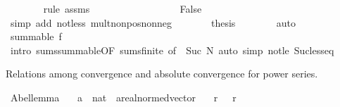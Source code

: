\begin{isabellebody}
\ \ \ \ \ \ \isamarkupfalse%
\ {\isacharparenleft}{\kern0pt}rule\ assms{\isacharparenleft}{\kern0pt}{}{\isacharparenright}{\kern0pt}{\isacharparenright}{\kern0pt}\isanewline
\ \ \ \ \isamarkupfalse%
\ \isamarkupfalse%
\ {\isachardoublequoteopen}{\isasymdots}\ {\isasymle}\ {}{\isachardoublequoteclose}\isanewline
\ \ \ \ \ \ \isamarkupfalse%
\ False\ \isamarkupfalse%
\ {\isacharparenleft}{\kern0pt}simp\ add{\isacharcolon}{\kern0pt}\ not{\isacharunderscore}{\kern0pt}less\ mult{\isacharunderscore}{\kern0pt}nonpos{\isacharunderscore}{\kern0pt}nonneg{\isacharparenright}{\kern0pt}\isanewline
\ \ \ \ \isamarkupfalse%
\ \isamarkupfalse%
\ {\isacharquery}{\kern0pt}thesis\isanewline
\ \ \ \ \ \ \isamarkupfalse%
\ auto\isanewline
\ \ \isamarkupfalse%
\isanewline
\ \ \isamarkupfalse%
\ \isamarkupfalse%
\ {\isachardoublequoteopen}summable\ f{\isachardoublequoteclose}\isanewline
\ \ \ \ \isamarkupfalse%
\ {\isacharparenleft}{\kern0pt}intro\ sums{\isacharunderscore}{\kern0pt}summable{\isacharbrackleft}{\kern0pt}OF\ sums{\isacharunderscore}{\kern0pt}finite{\isacharcomma}{\kern0pt}\ of\ {\isachardoublequoteopen}{\isacharbraceleft}{\kern0pt}{\isachardot}{\kern0pt}{\isachardot}{\kern0pt}\ Suc\ N{\isacharbraceright}{\kern0pt}{\isachardoublequoteclose}{\isacharbrackright}{\kern0pt}{\isacharparenright}{\kern0pt}\ {\isacharparenleft}{\kern0pt}auto\ simp{\isacharcolon}{\kern0pt}\ not{\isacharunderscore}{\kern0pt}le\ Suc{\isacharunderscore}{\kern0pt}less{\isacharunderscore}{\kern0pt}eq{}{\isacharparenright}{\kern0pt}\isanewline
{}\isamarkupfalse%
%
\endisatagproof
{\isafoldproof}%
%
\isadelimproof
\isanewline
%
\endisadelimproof
\isanewline
{}\isamarkupfalse%
%
\begin{isamarkuptext}%
Relations among convergence and absolute convergence for power series.%
\end{isamarkuptext}\isamarkuptrue%
\isamarkupfalse%
\ Abel{\isacharunderscore}{\kern0pt}lemma{\isacharcolon}{\kern0pt}\isanewline
\ \ \ a\ {\isacharcolon}{\kern0pt}{\isacharcolon}{\kern0pt}\ {\isachardoublequoteopen}nat\ {\isasymRightarrow}\ {\isacharprime}{\kern0pt}a{\isacharcolon}{\kern0pt}{\isacharcolon}{\kern0pt}real{\isacharunderscore}{\kern0pt}normed{\isacharunderscore}{\kern0pt}vector{\isachardoublequoteclose}\isanewline
\ \ \ r{\isacharcolon}{\kern0pt}\ {\isachardoublequoteopen}{}\ {\isasymle}\ r{\isachardoublequoteclose}\isanewline

\end{isabellebody}
